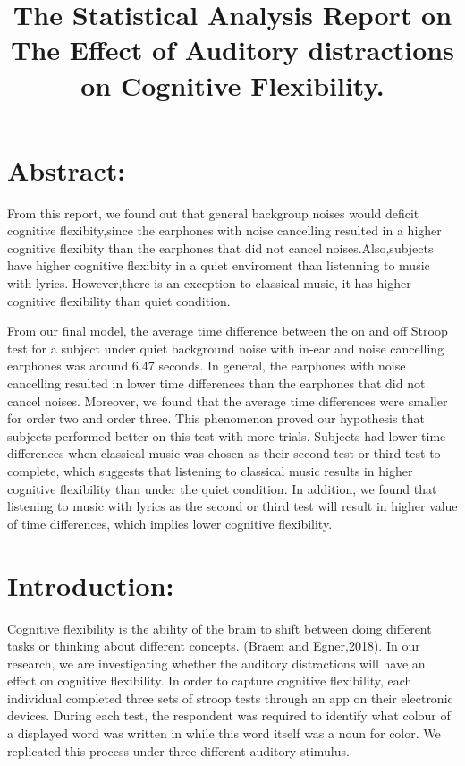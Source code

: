 \documentclass[]{article}
\title{The Statistical Analysis Report on The Effect of Auditory distractions
on Cognitive Flexibility.}
\author{}
\date{}
\begin{document}
\maketitle

\hypertarget{abstract}{%
\section{Abstract:}\label{abstract}}

From this report, we found out that general backgroup noises would
deficit cognitive flexibity,since the earphones with noise cancelling
resulted in a higher cognitive flexibity than the earphones that did not
cancel noises.Also,subjects have higher cognitive flexibity in a quiet
enviroment than listenning to music with lyrics. However,there is an
exception to classical music, it has higher cognitive flexibility than
quiet condition.

From our final model, the average time difference between the on and off
Stroop test for a subject under quiet background noise with in-ear and
noise cancelling earphones was around 6.47 seconds. In general, the
earphones with noise cancelling resulted in lower time differences than
the earphones that did not cancel noises. Moreover, we found that the
average time differences were smaller for order two and order three.
This phenomenon proved our hypothesis that subjects performed better on
this test with more trials. Subjects had lower time differences when
classical music was chosen as their second test or third test to
complete, which suggests that listening to classical music results in
higher cognitive flexibility than under the quiet condition. In
addition, we found that listening to music with lyrics as the second or
third test will result in higher value of time differences, which
implies lower cognitive flexibility.

\hypertarget{introduction}{%
\section{Introduction:}\label{introduction}}

Cognitive flexibility is the ability of the brain to shift between doing
different tasks or thinking about different concepts. (Braem and
Egner,2018). In our research, we are investigating whether the auditory
distractions will have an effect on cognitive flexibility. In order to
capture cognitive flexibility, each individual completed three sets of
stroop tests through an app on their electronic devices. During each
test, the respondent was required to identify what colour of a displayed
word was written in while this word itself was a noun for color. We
replicated this process under three different auditory stimulus.
\end{document}
